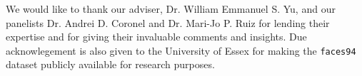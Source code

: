 \begin{acknowledgments}

    \noindent
    We would like to thank our adviser, Dr. William Emmanuel S. Yu, and our panelists Dr. Andrei D. Coronel and Dr. Mari-Jo P. Ruiz for lending their expertise and for giving their invaluable comments and insights.
Due acknowlegement is also given to the University of Essex for making the \texttt{faces94} dataset publicly available for research purposes.



\end{acknowledgments}
